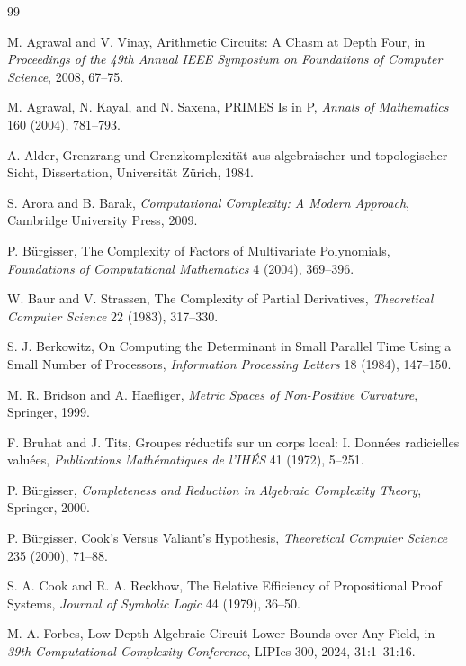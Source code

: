 \documentclass[11pt,letterpaper]{report}
\theoremstyle{plain}
\theoremstyle{definition}
\theoremstyle{remark}
\begin{document}
\begin{thebibliography}{99}

 M. Agrawal and V. Vinay, Arithmetic Circuits: A Chasm at Depth Four, in \emph{Proceedings of the 49th Annual IEEE Symposium on Foundations of Computer Science}, 2008, 67--75.

 M. Agrawal, N. Kayal, and N. Saxena, PRIMES Is in P, \emph{Annals of Mathematics} 160 (2004), 781--793.

 A. Alder, Grenzrang und Grenzkomplexit\"at aus algebraischer und topologischer Sicht, Dissertation, Universit\"at Z\"urich, 1984.

 S. Arora and B. Barak, \emph{Computational Complexity: A Modern Approach}, Cambridge University Press, 2009.

 P. B\"urgisser, The Complexity of Factors of Multivariate Polynomials, \emph{Foundations of Computational Mathematics} 4 (2004), 369--396.

 W. Baur and V. Strassen, The Complexity of Partial Derivatives, \emph{Theoretical Computer Science} 22 (1983), 317--330.

 S. J. Berkowitz, On Computing the Determinant in Small Parallel Time Using a Small Number of Processors, \emph{Information Processing Letters} 18 (1984), 147--150.

 M. R. Bridson and A. Haefliger, \emph{Metric Spaces of Non-Positive Curvature}, Springer, 1999.

 F. Bruhat and J. Tits, Groupes r\'eductifs sur un corps local: I. Donn\'ees radicielles valu\'ees, \emph{Publications Math\'ematiques de l'IH\'ES} 41 (1972), 5--251.

 P. B\"urgisser, \emph{Completeness and Reduction in Algebraic Complexity Theory}, Springer, 2000.

 P. B\"urgisser, Cook's Versus Valiant's Hypothesis, \emph{Theoretical Computer Science} 235 (2000), 71--88.

 S. A. Cook and R. A. Reckhow, The Relative Efficiency of Propositional Proof Systems, \emph{Journal of Symbolic Logic} 44 (1979), 36--50.

 M. A. Forbes, Low-Depth Algebraic Circuit Lower Bounds over Any Field, in \emph{39th Computational Complexity Conference}, LIPIcs 300, 2024, 31:1--31:16.


\end{thebibliography}
\end{document}

